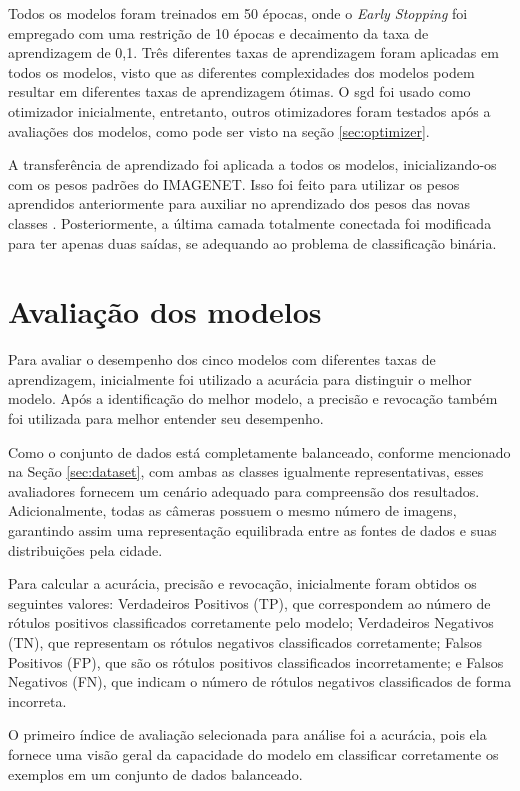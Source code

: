 Todos os modelos foram treinados em 50 épocas, onde o \textit{Early Stopping} foi empregado com uma restrição de 10 épocas e decaimento da taxa de aprendizagem de 0,1. Três diferentes taxas de aprendizagem foram aplicadas em todos os modelos, visto que as diferentes complexidades dos modelos podem resultar em diferentes taxas de aprendizagem ótimas. O \acrfull{sgd} foi usado como otimizador inicialmente, entretanto, outros otimizadores foram testados após a avaliações dos modelos, como pode ser visto na seção \ref{sec:optimizer}.

A transferência de aprendizado foi aplicada a todos os modelos, inicializando-os com os pesos padrões do IMAGENET. Isso foi feito para utilizar os pesos aprendidos anteriormente para auxiliar no aprendizado dos pesos das novas classes \cite{kolesnikov2020big}. Posteriormente, a última camada totalmente conectada foi modificada para ter apenas duas saídas, se adequando ao problema de classificação binária.
\section{Avaliação dos modelos}

Para avaliar o desempenho dos cinco modelos com diferentes taxas de aprendizagem, inicialmente foi utilizado a acurácia para distinguir o melhor modelo. 
Após a identificação do melhor modelo, a precisão e revocação também foi utilizada para melhor entender seu desempenho. 

Como o conjunto de dados está completamente balanceado, conforme mencionado na Seção \ref{sec:dataset}, com ambas as classes igualmente representativas, esses avaliadores fornecem um cenário adequado para compreensão dos resultados. Adicionalmente, todas as câmeras possuem o mesmo número de imagens, garantindo assim uma representação equilibrada entre as fontes de dados e suas distribuições pela cidade.

Para calcular a acurácia, precisão e revocação, inicialmente foram obtidos os seguintes valores: 
Verdadeiros Positivos (TP), que correspondem ao número de rótulos positivos classificados corretamente pelo modelo; 
Verdadeiros Negativos (TN), que representam os rótulos negativos classificados corretamente; 
Falsos Positivos (FP), que são os rótulos positivos classificados incorretamente; 
e Falsos Negativos (FN), que indicam o número de rótulos negativos classificados de forma incorreta.

O primeiro índice de avaliação selecionada para análise foi a acurácia, 
pois ela fornece uma visão geral da capacidade do modelo em classificar corretamente os exemplos em um conjunto de dados balanceado. 


